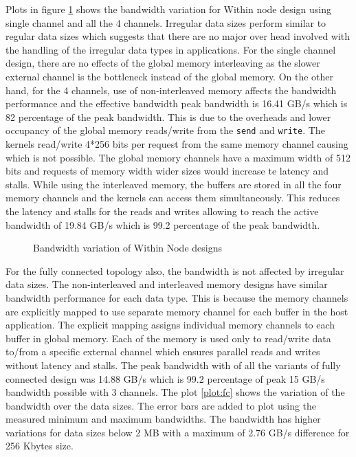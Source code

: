 Plots in figure \ref{plot:wn} shows the bandwidth variation for Within node design using single channel
and all the 4 channels. Irregular data sizes perform similar to regular data sizes which suggests that
there are no major over head involved with the handling of the irregular data types in applications.
For the single channel design, there are no effects of the global memory interleaving as the slower
external channel is the bottleneck instead of the global memory. On the other hand, for the 4 channels,
use of non-interleaved memory affects the bandwidth performance and the effective bandwidth peak bandwidth
is 16.41 GB/s which is 82 percentage of the peak bandwidth. This is due to the overheads and lower occupancy
of the global memory reads/write from the \texttt{send} and \texttt{write}. The kernels read/write 4*256 bits
per request from the same memory channel causing which is not possible. The global memory channels have a
maximum width of 512 bits and requests of memory width wider sizes would increase te latency and
stalls. While using the interleaved memory, the buffers are stored in all the four memory channels and
the kernels can access them simultaneously. This reduces the latency and stalls for the reads and writes
allowing to reach the active bandwidth of 19.84 GB/s which is 99.2 percentage of the peak bandwidth.


\begin{figure}[ht]
    \centering
    \scalebox{0.8}{}
    \caption{Bandwidth variation of Within Node designs}
    \label{plot:wn}
\end{figure}


For the fully connected topology also, the bandwidth is not affected by irregular data sizes. The non-interleaved
and interleaved memory designs have similar bandwidth performance for each data type. This is because
the memory channels are explicitly mapped to use separate memory channel for each buffer in the host application.
The explicit mapping assigns individual memory channels to each buffer in global memory. Each of the memory
is used only to read/write data to/from a specific external channel which ensures parallel reads
and writes without latency and stalls. The peak bandwidth with of all the variants of fully connected
design was 14.88 GB/s which is 99.2 percentage of peak 15 GB/s bandwidth possible with 3 channels.
The plot \ref{plot:fc} shows the variation of the bandwidth over the data sizes. The error bars are
added to plot using the measured minimum and maximum bandwidths. The bandwidth has higher variations
for data sizes below 2 MB with a maximum of 2.76 GB/s difference for 256 Kbytes size.

